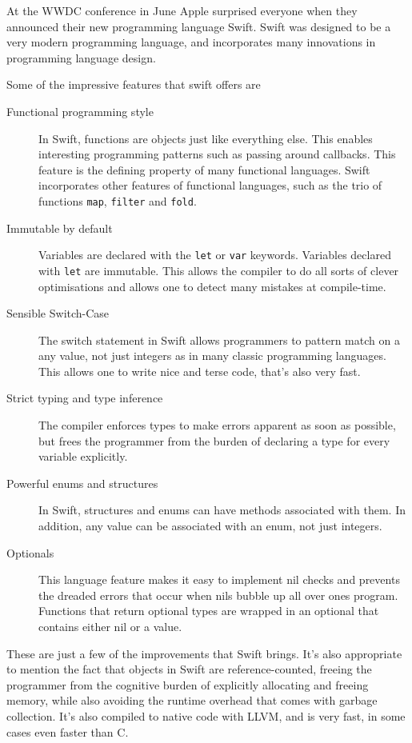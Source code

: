 \documentclass[DIV=calc, paper=a4, fontsize=11pt, twocolumn]{scrartcl}	 %
\begin{document}
At the WWDC conference in June Apple surprised everyone when they announced their new programming
language Swift. Swift was designed to be a very modern programming language, and incorporates
many innovations in programming language design.

Some of the impressive features that swift offers are
\begin{description}
    \item[Functional programming style] In Swift, functions are objects just like everything else.
        This enables interesting programming patterns such as passing around callbacks. This feature
        is the defining property of many functional languages. Swift incorporates other features 
        of functional languages, such as the trio of functions \texttt{map}, \texttt{filter} and \texttt{fold}.
    \item[Immutable by default] Variables are declared with the \texttt{let} or \texttt{var}
        keywords. Variables declared with \texttt{let} are immutable. This allows the compiler to
        do all sorts of clever optimisations and allows one to detect many mistakes at compile-time.
    \item[Sensible Switch-Case] The switch statement in Swift allows programmers to pattern match on
        a any value, not just integers as in many classic programming languages. This allows one 
        to write nice and terse code, that's also very fast.
    \item[Strict typing and type inference] The compiler enforces types to make errors apparent as
        soon as possible, but frees the programmer from the burden of declaring a type for every
        variable explicitly.
    \item[Powerful enums and structures] In Swift, structures and enums can have methods associated with them. In addition, any value can be associated with an enum, not just integers.
    \item[Optionals] This language feature makes it easy to implement nil checks and prevents the 
        dreaded errors that occur when nils bubble up all over ones program. Functions that return 
        optional types are wrapped in an optional that contains either nil or a value. 
\end{description}

These are just a few of the improvements that Swift brings. It's also appropriate to mention the fact
that objects in Swift are reference-counted, freeing the programmer from the cognitive burden of
explicitly allocating and freeing memory, while also avoiding the runtime overhead that comes with
garbage collection. It's also compiled to native code with LLVM, and is very fast, in some cases even
faster than C.
\end{document}
